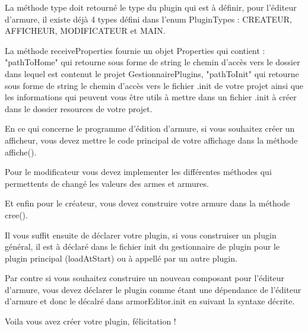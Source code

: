La méthode type doit retourné le type du plugin qui est à définir, pour l'éditeur d'armure, il existe déjà 4 types défini dans l'enum PluginTypes : CREATEUR, AFFICHEUR, MODIFICATEUR et MAIN.

La méthode receiveProperties fournie un objet Properties qui contient : "pathToHome" qui retourne sous forme de string le chemin d'accès vers le dossier dans lequel est contenut le projet GestionnairePlugins, "pathToInit" qui retourne sous forme de string le chemin d'accès vers le fichier .init de votre projet ainsi que les informations qui peuvent vous être utils à mettre dans un fichier .init à créer dans le dossier resources de votre projet.
\vspace{0.5cm}

En ce qui concerne le programme d'édition d'armure, si vous souhaitez créer un afficheur, vous devez mettre le code principal de votre affichage dans la méthode affiche().

Pour le modificateur vous devez implementer les différentes méthodes qui permettents de changé les valeurs des armes et armures.

Et enfin pour le créateur, vous devez construire votre armure dans la méthode cree().
\vspace{0.5cm}

Il vous suffit ensuite de déclarer votre plugin, si vous construiser un plugin général, il est à déclaré dans le fichier init du gestionnaire de plugin pour le plugin principal (loadAtStart) ou à appellé par un autre plugin.

Par contre si vous souhaitez construire un nouveau composant pour l'éditeur d'armure, vous devez déclarer le plugin comme étant une dépendance de l'éditeur d'armure et donc le décalré dans armorEditor.init en suivant la syntaxe décrite.
\vspace{0.5cm}

Voila vous avez créer votre plugin, félicitation !
